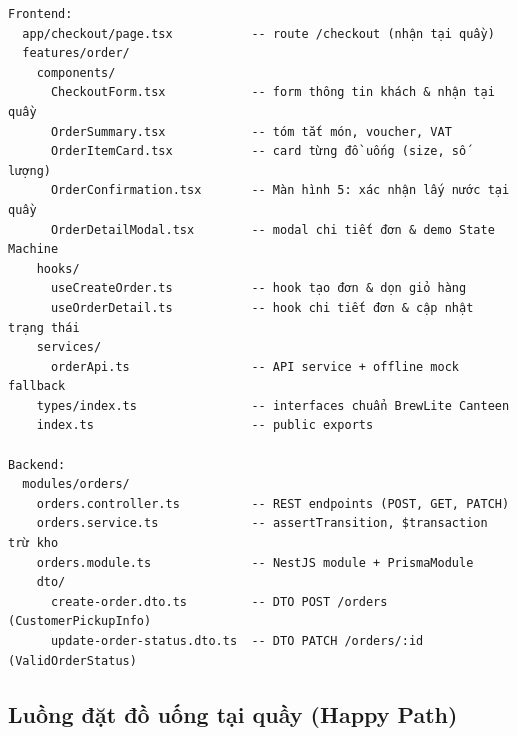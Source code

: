 \documentclass[12pt,a4paper]{article}
\begin{document}
\begin{verbatim}
Frontend:
  app/checkout/page.tsx           -- route /checkout (nhận tại quầy)
  features/order/
    components/
      CheckoutForm.tsx            -- form thông tin khách & nhận tại quầy
      OrderSummary.tsx            -- tóm tắt món, voucher, VAT
      OrderItemCard.tsx           -- card từng đồ uống (size, số lượng)
      OrderConfirmation.tsx       -- Màn hình 5: xác nhận lấy nước tại quầy
      OrderDetailModal.tsx        -- modal chi tiết đơn & demo State Machine
    hooks/
      useCreateOrder.ts           -- hook tạo đơn & dọn giỏ hàng
      useOrderDetail.ts           -- hook chi tiết đơn & cập nhật trạng thái
    services/
      orderApi.ts                 -- API service + offline mock fallback
    types/index.ts                -- interfaces chuẩn BrewLite Canteen
    index.ts                      -- public exports

Backend:
  modules/orders/
    orders.controller.ts          -- REST endpoints (POST, GET, PATCH)
    orders.service.ts             -- assertTransition, $transaction trừ kho
    orders.module.ts              -- NestJS module + PrismaModule
    dto/
      create-order.dto.ts         -- DTO POST /orders (CustomerPickupInfo)
      update-order-status.dto.ts  -- DTO PATCH /orders/:id (ValidOrderStatus)
\end{verbatim}

\subsection{Luồng đặt đồ uống tại quầy (Happy Path)}

\begin{center}
\end{center}
\end{document}

